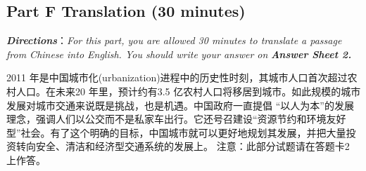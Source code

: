 \documentclass[UTF8,11pt]{ctexart}
\begin{document}
\subsection*{\textbf{Part F} \textbf{Translation} \textbf{(30 minutes)}}


\textbf{\textit{Directions}}：\textit{For this part, you are allowed 30 minutes to translate a passage from Chinese into English. You should write} \textit{your answer on}\textbf{\textit{ Answer Sheet 2.}}


2011 年是中国城市化(urbanization)进程中的历史性时刻，其城市人口首次超过农村人口。在未来20 年里，预计约有3.5 亿农村人口将移居到城市。如此规模的城市发展对城市交通来说既是挑战，也是机遇。中国政府一直提倡 “以人为本”的发展理念，强调人们以公交而不是私家车出行。它还号召建设“资源节约和环境友好型”社会。有了这个明确的目标，中国城市就可以更好地规划其发展，并把大量投资转向安全、清洁和经济型交通系统的发展上。 注意：此部分试题请在答题卡2 上作答。
\end{document}
